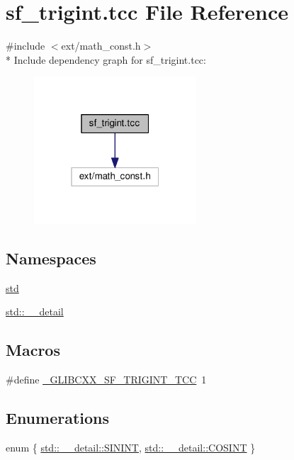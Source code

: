 \hypertarget{sf__trigint_8tcc}{}\section{sf\+\_\+trigint.\+tcc File Reference}
\label{sf__trigint_8tcc}
{\ttfamily \#include $<$ext/math\+\_\+const.\+h$>$}\\*
Include dependency graph for sf\+\_\+trigint.\+tcc\+:
\nopagebreak
\begin{figure}[H]
\begin{center}
\leavevmode
\includegraphics[width=172pt]{sf__trigint_8tcc__incl}
\end{center}
\end{figure}
\subsection*{Namespaces}
\begin{DoxyCompactItemize}
\item 
 \hyperlink{namespacestd}{std}
\item 
 \hyperlink{namespacestd_1_1____detail}{std\+::\+\_\+\+\_\+detail}
\end{DoxyCompactItemize}
\subsection*{Macros}
\begin{DoxyCompactItemize}
\item 
\#define \hyperlink{sf__trigint_8tcc_afde1ee684ded2155f3a3b305a31bb18e}{\+\_\+\+G\+L\+I\+B\+C\+X\+X\+\_\+\+S\+F\+\_\+\+T\+R\+I\+G\+I\+N\+T\+\_\+\+T\+C\+C}~1
\end{DoxyCompactItemize}
\subsection*{Enumerations}
\begin{DoxyCompactItemize}
\item 
enum \{ \hyperlink{namespacestd_1_1____detail_a354c633cb3e397eae4c31776b2d67923a0fef08e2967964a1421753c5d738c838}{std\+::\+\_\+\+\_\+detail\+::\+S\+I\+N\+I\+N\+T}, 
\hyperlink{namespacestd_1_1____detail_a354c633cb3e397eae4c31776b2d67923a4b5ea0190e37e477a2874e231190489e}{std\+::\+\_\+\+\_\+detail\+::\+C\+O\+S\+I\+N\+T}
 \}
\end{DoxyCompactItemize}
